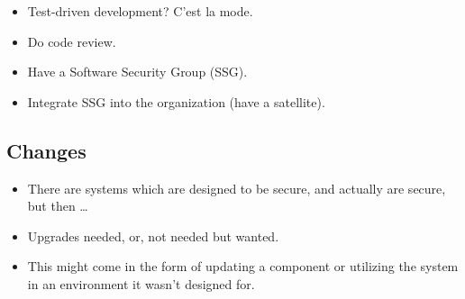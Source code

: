 \begin{frame}
  \begin{question}
    \begin{itemize}
      \item Test-driven development? C'est la mode.
    \end{itemize}
  \end{question}

  \pause

  \begin{solution}
    \begin{itemize}
      \item Do code review.
      \item Have a Software Security Group (SSG).
      \item Integrate SSG into the organization (have a satellite).
    \end{itemize}
  \end{solution}
\end{frame}

\subsection{Changes}


\begin{frame}
  \begin{remark}
    \begin{itemize}
      \item There are systems which are designed to be secure, and actually are 
        secure, but then \dots

      \item Upgrades needed, or, not needed but wanted.

      \item This might come in the form of updating a component or utilizing the 
        system in an environment it wasn't designed for.

    \end{itemize}
  \end{remark}
\end{frame}


